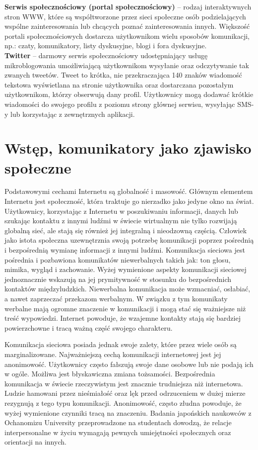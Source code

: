\documentclass[a4paper,12pt]{article}
\begin{document}
\noindent\textbf{Serwis społecznościowy (portal społecznościowy)} -- rodzaj interaktywnych stron WWW, które są współtworzone przez sieci społeczne osób podzielających wspólne zainteresowania lub chcących poznać zainteresowania innych. Większość portali społecznościowych dostarcza użytkownikom wielu sposobów komunikacji, np.: czaty, komunikatory, listy dyskusyjne, blogi i fora dyskusyjne.\\

\noindent\textbf{Twitter} -- darmowy serwis społecznościowy udostępniający usługę mikroblogowania umożliwiającą użytkownikom wysyłanie oraz odczytywanie tak zwanych tweetów. Tweet to krótka, nie przekraczająca 140 znaków wiadomość tekstowa wyświetlana na stronie użytkownika oraz dostarczana pozostałym użytkownikom, którzy obserwują dany profil. Użytkownicy mogą dodawać krótkie wiadomości do swojego profilu z poziomu strony głównej serwisu, wysyłając SMS-y lub korzystając z zewnętrznych aplikacji.\\

\section[Wstęp, komunikatory jako zjawisko społeczne]{Wstęp, komunikatory jako zjawisko społeczne}
Podstawowymi cechami Internetu są globalność i masowość.
Głównym elementem Internetu jest społeczność, która traktuje go nierzadko jako jedyne okno na świat.
Użytkownicy, korzystając z Internetu w poszukiwaniu informacji, danych lub szukając kontaktu z innymi ludźmi w świecie wirtualnym nie tylko rozwijają globalną sieć, ale stają się również jej integralną i nieodzowną częścią.
Człowiek jako istota społeczna uzewnętrznia swoją potrzebę komunikacji poprzez pośrednią i bezpośrednią wymianę informacji z innymi ludźmi. Komunikacja sieciowa jest pośrednia i pozbawiona komunikatów niewerbalnych takich jak:
ton głosu, mimika, wygląd i zachowanie. Wyżej wymienione aspekty komunikacji sieciowej jednoznacznie wskazują na jej prymitywność w stosunku do bezpośrednich kontaktów międzyludzkich. Niewerbalna komunikacja może wzmacniać, osłabiać, a nawet zaprzeczać przekazom werbalnym. W związku z tym komunikaty werbalne mają ogromne znaczenie w komunikacji i mogą stać się ważniejsze niż treść wypowiedzi. Internet powoduje, że wzajemne kontakty stają się bardziej powierzchowne i tracą ważną część swojego charakteru.

\par Komunikacja sieciowa posiada jednak swoje zalety, które przez wiele osób są marginalizowane.
Najważniejszą cechą komunikacji internetowej jest jej anonimowość. Użytkownicy często fałszują swoje dane osobowe lub nie podają ich w ogóle. Możliwa jest błyskawiczna zmiana tożsamości. Bezpośrednia komunikacja w świecie rzeczywistym jest znacznie trudniejsza niż internetowa. Ludzie hamowani przez nieśmiałość oraz lęk przed odrzuceniem w dużej mierze rezygnują z tego typu komunikacji. Anonimowość, często złudna powoduje, że wyżej wymienione czynniki tracą na znaczeniu. Badania japońskich naukowców z Ochanomizu University przeprowadzone na studentach dowodzą, że relacje interpersonalne w życiu wymagają pewnych umiejętności społecznych oraz orientacji na innych.
\end{document}
